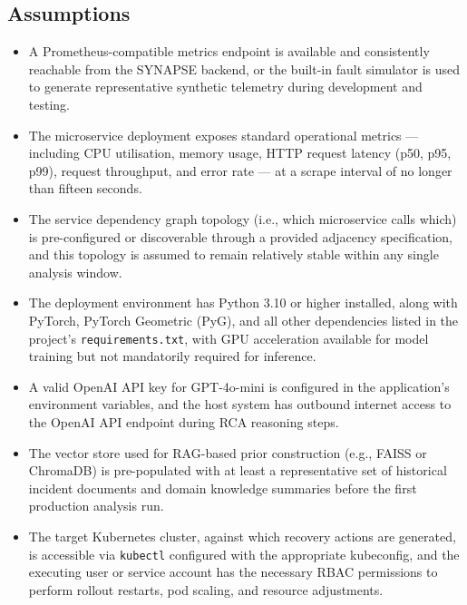 \subsection{Assumptions}

\begin{itemize}
    \item A Prometheus-compatible metrics endpoint is available and consistently reachable from the SYNAPSE backend, or the built-in fault simulator is used to generate representative synthetic telemetry during development and testing.

    \item The microservice deployment exposes standard operational metrics — including CPU utilisation, memory usage, HTTP request latency (p50, p95, p99), request throughput, and error rate — at a scrape interval of no longer than fifteen seconds.

    \item The service dependency graph topology (i.e., which microservice calls which) is pre-configured or discoverable through a provided adjacency specification, and this topology is assumed to remain relatively stable within any single analysis window.

    \item The deployment environment has Python 3.10 or higher installed, along with PyTorch, PyTorch Geometric (PyG), and all other dependencies listed in the project's \texttt{requirements.txt}, with GPU acceleration available for model training but not mandatorily required for inference.

    \item A valid OpenAI API key for GPT-4o-mini is configured in the application's environment variables, and the host system has outbound internet access to the OpenAI API endpoint during RCA reasoning steps.

    \item The vector store used for RAG-based prior construction (e.g., FAISS or ChromaDB) is pre-populated with at least a representative set of historical incident documents and domain knowledge summaries before the first production analysis run.

    \item The target Kubernetes cluster, against which recovery actions are generated, is accessible via \texttt{kubectl} configured with the appropriate kubeconfig, and the executing user or service account has the necessary RBAC permissions to perform rollout restarts, pod scaling, and resource adjustments.


\end{itemize}
